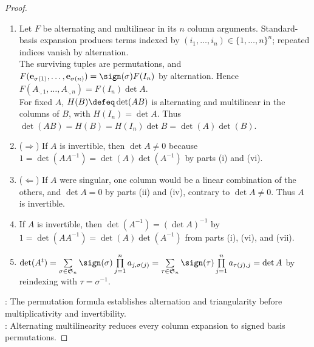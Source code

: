\begin{theorem}
\begin{proof}
\begin{enumerate}[label=(\roman*)]
\item[$(vi)$] Let $F$ be alternating and multilinear in its $n$ column arguments. Standard-basis expansion produces terms indexed by $(i_1,\ldots,i_n)\in\{1,\ldots,n\}^n$; repeated indices vanish by alternation.\\
The surviving tuples are permutations, and $F(\mathbf{e}_{\sigma(1)},\ldots,\mathbf{e}_{\sigma(n)})=\sign(\sigma)F(I_n)$ by alternation. Hence $F(A_{\cdot,1},\ldots,A_{\cdot,n})=F(I_n)\det A$.\\
For fixed $A$, $H(B)\defeq\det(AB)$ is alternating and multilinear in the columns of $B$, with $H(I_n)=\det A$. Thus $\det(AB)=H(B)=H(I_n)\det B=\det(A)\det(B)$.
\item[$(vii)$] ($\Rightarrow$) If $A$ is invertible, then $\det A\neq0$ because $1=\det(AA^{-1})=\det(A)\det(A^{-1})$ by parts (i) and (vi).
\item[$(vii)$] ($\Leftarrow$) If $A$ were singular, one column would be a linear combination of the others, and $\det A=0$ by parts (ii) and (iv), contrary to $\det A\neq0$. Thus $A$ is invertible.
\item[$(viii)$] If $A$ is invertible, then $\det(A^{-1})=(\det A)^{-1}$ by $1=\det(AA^{-1})=\det(A)\det(A^{-1})$ from parts (i), (vi), and (vii).
\item[$(ix)$] $\det(A^t)=\sum\limits_{\sigma\in\mathfrak{S}_n}\sign(\sigma)\prod\limits_{j=1}^{n}a_{j,\sigma(j)}=\sum\limits_{\tau\in\mathfrak{S}_n}\sign(\tau)\prod\limits_{j=1}^{n}a_{\tau(j),j}=\det A$ by reindexing with $\tau=\sigma^{-1}$.
\end{enumerate}
: The permutation formula establishes alternation and triangularity before multiplicativity and invertibility.\\
: Alternating multilinearity reduces every column expansion to signed basis permutations.
\end{proof}
\end{theorem}


